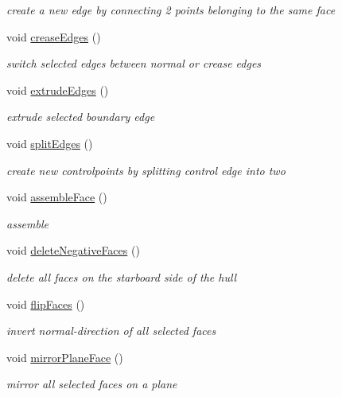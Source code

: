 \begin{DoxyCompactItemize}
\begin{DoxyCompactList}\small\item\em create a new edge by connecting 2 points belonging to the same face \end{DoxyCompactList}\item 
void \hyperlink{classShipCAD_1_1Controller_a8fbe457b09df7d49442f58c97b2c50f3}{crease\-Edges} ()
\begin{DoxyCompactList}\small\item\em switch selected edges between normal or crease edges \end{DoxyCompactList}\item 
void \hyperlink{classShipCAD_1_1Controller_ab3698ec4918b622cba53a33f96c57e73}{extrude\-Edges} ()
\begin{DoxyCompactList}\small\item\em extrude selected boundary edge \end{DoxyCompactList}\item 
void \hyperlink{classShipCAD_1_1Controller_a0737f31baec832fa23070d3d2accce20}{split\-Edges} ()
\begin{DoxyCompactList}\small\item\em create new controlpoints by splitting control edge into two \end{DoxyCompactList}\item 
void \hyperlink{classShipCAD_1_1Controller_afba338b6c9bff947b850c220d031a7de}{assemble\-Face} ()
\begin{DoxyCompactList}\small\item\em assemble \end{DoxyCompactList}\item 
void \hyperlink{classShipCAD_1_1Controller_a5ff6228a1b2fd0400ba51a8ab7ee01a8}{delete\-Negative\-Faces} ()
\begin{DoxyCompactList}\small\item\em delete all faces on the starboard side of the hull \end{DoxyCompactList}\item 
void \hyperlink{classShipCAD_1_1Controller_a6314812b2170bdbbf17e79374e745005}{flip\-Faces} ()
\begin{DoxyCompactList}\small\item\em invert normal-\/direction of all selected faces \end{DoxyCompactList}\item 
void \hyperlink{classShipCAD_1_1Controller_a2f7c4f8e0759c8f59cd0b2d008e2776b}{mirror\-Plane\-Face} ()
\begin{DoxyCompactList}\small\item\em mirror all selected faces on a plane \end{DoxyCompactList}\item 

\end{DoxyCompactItemize}
